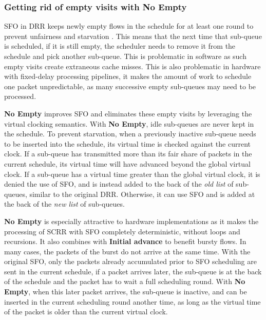 \vspace{-2mm}
\subsubsection{Getting rid of empty visits with No Empty}
\label{sub:no-empty}



SFO in DRR keeps newly empty flows in the schedule for at least one
round to prevent unfairness and starvation \cite{formal}. This means
that the next time that sub-queue is scheduled, if it is still empty,
the scheduler needs to remove it from the schedule and pick another
sub-queue. This is problematic in software as such empty visits create
extraneous cache misses. This is also problematic in hardware with
fixed-delay processing pipelines, it makes the amount of work to
schedule one packet unpredictable, as many successive empty sub-queues
may need to be processed.

\textbf{No Empty} improves SFO and eliminates these empty visits by
leveraging the virtual clocking semantics. With \textbf{No Empty},
idle sub-queues are never kept in the schedule. To prevent starvation,
when a previously inactive sub-queue needs to be inserted into the
schedule, its virtual time is checked against the current clock. If
a sub-queue has transmitted more than its fair share of packets in the
current schedule, its virtual time will have advanced beyond the
global virtual clock. If a sub-queue has a virtual time greater than
the global virtual clock, it is denied the use of SFO, and is instead
added to the back of the \textit{old list} of sub-queues, similar to
the original DRR. Otherwise, it can use SFO and is added at the back
of the \textit{new list} of sub-queues.

\textbf{No Empty} is especially attractive to hardware implementations
as it makes the processing of SCRR with SFO completely deterministic,
without loops and recursions. It also combines with \textbf{Initial
advance} to benefit bursty flows. In many cases, the packets of the
burst do not arrive at the same time. With the original SFO, only
the packets already accumulated prior to SFO scheduling are sent in
the current schedule, if a packet arrives later, the sub-queue is at
the back of the schedule and the packet has to wait a full scheduling
round. With \textbf{No Empty}, when this later packet arrives, the
sub-queue is inactive, and can be inserted in the current scheduling
round another time, as long as the virtual time of the packet is older
than the current virtual clock.


